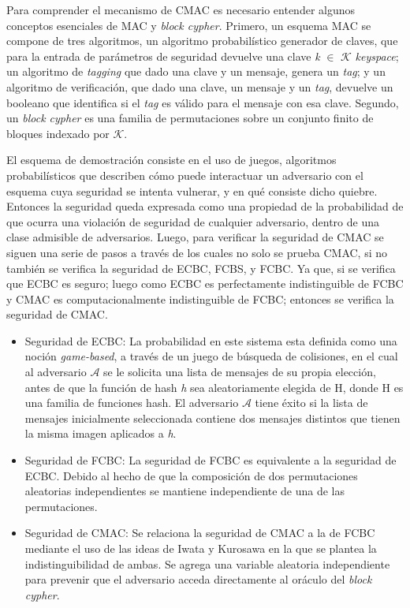 \documentclass[runningheads]{llncs}
\begin{document}
Para comprender el mecanismo de CMAC es necesario entender algunos conceptos esenciales de MAC y \textit{block cypher}. Primero, un esquema MAC se compone de tres algoritmos, un algoritmo probabilístico generador de claves, que para la entrada de parámetros de seguridad devuelve una clave \textit{k} $\in$ $\mathcal{K}$ \textit{keyspace}; un algoritmo de \textit{tagging} que dado una clave y un mensaje, genera un \textit{tag}; y un algoritmo de verificación, que dado una clave, un mensaje y un \textit{tag}, devuelve un booleano que identifica si el \textit{tag} es válido para el mensaje con esa clave. Segundo, un \textit{block cypher} es una familia de permutaciones sobre un conjunto finito de bloques indexado por $\mathcal{K}$.

El esquema de demostración consiste en el uso de juegos, algoritmos probabilísticos que describen cómo puede interactuar un adversario con el esquema cuya seguridad se intenta vulnerar, y en qué consiste dicho quiebre. Entonces la seguridad queda expresada como una propiedad de la probabilidad de que ocurra una violación de seguridad de cualquier adversario, dentro de una clase admisible de adversarios. Luego, para verificar la seguridad de CMAC se siguen una serie de pasos a través de los cuales no solo se prueba CMAC, si no también se verifica la seguridad de ECBC, FCBS, y FCBC. Ya que, si se verifica que ECBC es seguro; luego como ECBC es perfectamente indistinguible de FCBC y CMAC es computacionalmente indistinguible de FCBC; entonces se verifica la seguridad de CMAC.

\begin{itemize}
\item Seguridad de ECBC: La probabilidad en este sistema esta definida como una noción \textit{game-based}, a través de un juego de búsqueda de colisiones, en el cual al adversario $\mathcal{A}$ se le solicita una lista de mensajes de su propia elección, antes de que la función de hash \textit{h} sea aleatoriamente elegida de H, donde H es una familia de funciones hash. El adversario $\mathcal{A}$ tiene éxito si la lista de mensajes inicialmente seleccionada contiene dos mensajes distintos que tienen la misma imagen aplicados a \textit{h}.

\item Seguridad de FCBC: La seguridad de FCBC es equivalente a la seguridad de ECBC. Debido al hecho de que la composición de dos permutaciones aleatorias independientes se mantiene independiente de una de las permutaciones.

\item Seguridad de CMAC: Se relaciona la seguridad de CMAC a la de FCBC mediante el uso de las ideas de Iwata y Kurosawa en la que se plantea la indistinguibilidad de ambas. Se agrega una variable aleatoria independiente para prevenir que el adversario acceda directamente al oráculo del \textit{block cypher}.
\end{itemize}
\end{document}
